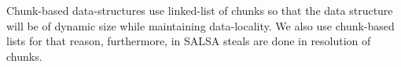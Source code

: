 Chunk-based data-structures
\cite{Braginsky:2011:LLL:1946143.1946153, 
Gidenstam:2010:CLQ:1940234.1940266,
Hendler:2006:DNW:1160290.1160294, Sundell:2011:LAC:1989493.1989550} use linked-list of chunks so
that the data structure will be of dynamic size while maintaining data-locality. We also use
chunk-based lists for that reason, furthermore, in SALSA steals are done in resolution of chunks.